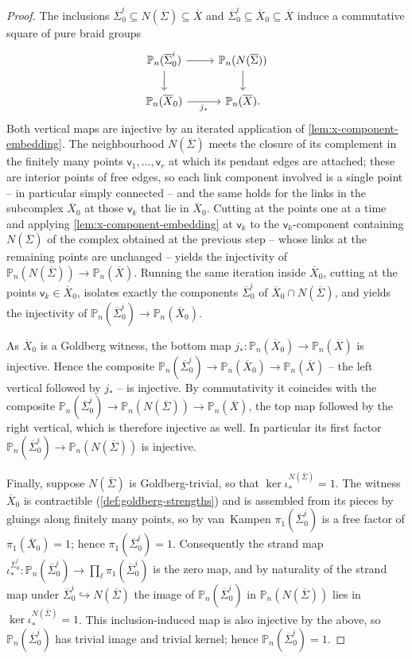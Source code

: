 \documentclass[reqno]{amsart}
\theoremstyle{definition}
\newcommand\sfv{\mathsf{v}}
\newcommand{\PB}{\mathbb{P}}
\renewcommand{\bar}{\overline}
\numberwithin{equation}{section}
\begin{document}
\begin{proof}
The inclusions \(\bar\Sigma_0^i\subseteq N(\bar\Sigma)\subseteq\bar X\)
and \(\bar\Sigma_0^i\subseteq\bar X_0\subseteq\bar X\) induce a
commutative square of pure braid groups
\[
\begin{tikzcd}
\PB_n(\bar\Sigma_0^i)\ar[r]\ar[d] & \PB_n(N(\bar\Sigma))\ar[d]\\
\PB_n(\bar X_0)\ar[r,"j_\ast"'] & \PB_n(\bar X).
\end{tikzcd}
\]
Both vertical maps are injective by an iterated application of
\cref{lem:x-component-embedding}. The neighbourhood
\(N(\bar\Sigma)\) meets the closure of its complement in the
finitely many points \(\sfv_1,\dots,\sfv_r\) at which its pendant edges
are attached; these are interior points of free edges, so each
link component involved is a single point -- in particular simply
connected -- and the same holds for the links in the subcomplex
\(\bar X_0\) at those \(\sfv_k\) that lie in \(\bar X_0\). Cutting at
the points one at a time and applying
\cref{lem:x-component-embedding} at \(\sfv_k\) to the
\(\sfv_k\)-component containing \(N(\bar\Sigma)\) of the complex
obtained at the previous step -- whose links at the remaining
points are unchanged -- yields the injectivity of
\(\PB_n(N(\bar\Sigma))\to\PB_n(\bar X)\). Running the same
iteration inside \(\bar X_0\), cutting at the points
\(\sfv_k\in\bar X_0\), isolates exactly the components
\(\bar\Sigma_0^i\) of \(\bar X_0\cap N(\bar\Sigma)\), and yields
the injectivity of
\(\PB_n(\bar\Sigma_0^i)\to\PB_n(\bar X_0)\).

As \(\bar X_0\) is a Goldberg witness, the bottom map
\(j_\ast\colon\PB_n(\bar X_0)\to\PB_n(\bar X)\) is injective. Hence the
composite \(\PB_n(\bar\Sigma_0^i)\to\PB_n(\bar X_0)\to\PB_n(\bar X)\)
-- the left vertical followed by \(j_\ast\) -- is injective. By
commutativity it coincides with the composite
\(\PB_n(\bar\Sigma_0^i)\to\PB_n(N(\bar\Sigma))\to\PB_n(\bar X)\), the
top map followed by the right vertical, which is therefore injective as
well. In particular its first factor
\(\PB_n(\bar\Sigma_0^i)\to\PB_n(N(\bar\Sigma))\) is injective.

Finally, suppose \(N(\bar\Sigma)\) is Goldberg-trivial, so that
\(\ker\iota_\ast^{N(\bar\Sigma)}=1\). The witness \(\bar X_0\) is
contractible (\cref{def:goldberg-strengths}) and is assembled from
its pieces by gluings along finitely many points, so by van~Kampen
\(\pi_1(\bar\Sigma_0^i)\) is a free factor of
\(\pi_1(\bar X_0)=1\); hence \(\pi_1(\bar\Sigma_0^i)=1\). Consequently the strand map
\(\iota_\ast^{\bar\Sigma_0^i}\colon\PB_n(\bar\Sigma_0^i)\to
\prod_{\ell}\pi_1(\bar\Sigma_0^i)\) is the zero map, and by naturality
of the strand map under \(\bar\Sigma_0^i\hookrightarrow N(\bar\Sigma)\)
the image of \(\PB_n(\bar\Sigma_0^i)\) in \(\PB_n(N(\bar\Sigma))\) lies
in \(\ker\iota_\ast^{N(\bar\Sigma)}=1\). This inclusion-induced map is
also injective by the above, so \(\PB_n(\bar\Sigma_0^i)\) has trivial
image and trivial kernel; hence \(\PB_n(\bar\Sigma_0^i)=1\).
\end{proof}
\end{document}
